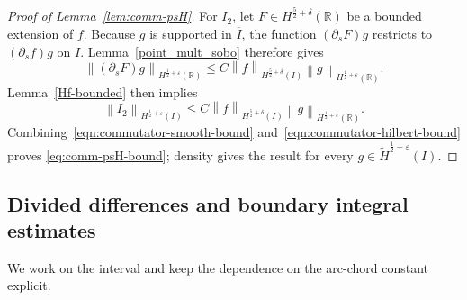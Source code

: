 \documentclass[11pt,reqno]{amsart}
\theoremstyle{plain}
\theoremstyle{definition}
\numberwithin{equation}{section}
\newcommand{\p}{\partial}
\newcommand{\wt}[1]{\widetilde{#1}}
\newcommand{\norm}[1]{\left\lVert #1 \right\rVert}
\newcommand{\R}{\mathbb{R}}
\newcommand{\thi}[1]{\wt H^{#1}(I)}
\newcommand{\hr}[1]{H^{#1}(\R)}
\begin{document}
\begin{proof}[Proof of Lemma~\ref{lem:comm-psH}]
For $I_2$, let $F\in H^{\frac52+\delta}(\R)$ be a bounded extension of
$f$. Because $g$ is supported in $\overline I$, the function
$(\p_sF)g$ restricts to $(\p_sf)g$ on $I$. Lemma~\ref{point_mult_sobo}
therefore gives
\begin{equation}
    \norm{(\p_sF)g}_{\hr{\frac12+\varepsilon}}
    \le C\norm{f}_{H^{\frac52+\delta}(I)}
    \norm{g}_{\hr{\frac12+\varepsilon}}.
\end{equation}
Lemma~\ref{Hf-bounded} then implies
\begin{equation}\label{eqn:commutator-hilbert-bound}
    \norm{I_2}_{H^{\frac12+\varepsilon}(I)}
    \le C\norm{f}_{H^{\frac52+\delta}(I)}
    \norm{g}_{\hr{\frac12+\varepsilon}}.
\end{equation}
Combining~\eqref{eqn:commutator-smooth-bound} and~\eqref{eqn:commutator-hilbert-bound} proves
\eqref{eq:comm-psH-bound}; density gives the result for every
$g\in\thi{\frac12+\varepsilon}$.
\end{proof}

\subsection{Divided differences and boundary integral estimates}
\label{app:boundary-integral-estimates}

We work on the interval and keep the dependence on the arc-chord constant
explicit.\par
\end{document}
